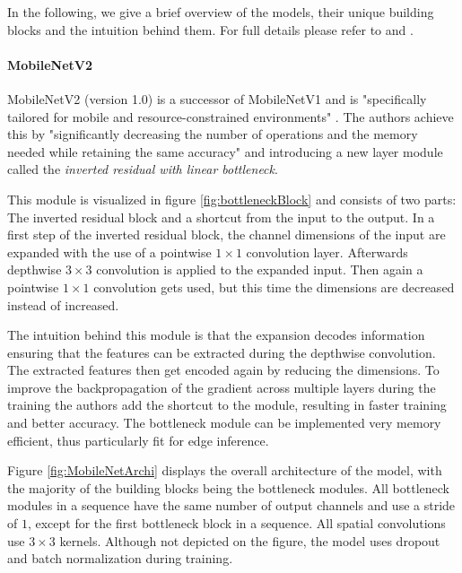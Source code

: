 In the following, we give a brief overview of the models, their unique building blocks and the intuition behind them.
For full details please refer to \cite{DBLP:journals/corr/abs-1801-04381} and \cite{InceptionV4}.

\paragraph{MobileNetV2}
MobileNetV2 (version 1.0) is a successor of MobileNetV1 and is "specifically tailored for mobile and resource-constrained environments" \cite{DBLP:journals/corr/abs-1801-04381}. The authors achieve this by "significantly decreasing the number of operations and the memory needed while retaining the same accuracy"  \cite{DBLP:journals/corr/abs-1801-04381} and introducing a new layer module called the
\emph{inverted residual with linear bottleneck}.

This module is visualized in figure \ref{fig:bottleneckBlock} and consists of two parts: The inverted residual block and a shortcut from the input to the output.
In a first step of the inverted residual block, the channel dimensions of the input are expanded with the use of a pointwise $1\times1$ convolution layer. 
Afterwards depthwise $3\times3$ convolution is applied to the expanded input. Then again a pointwise $1\times1$ convolution gets used, but this time the dimensions are decreased instead of increased.

The intuition behind this module is that the expansion decodes information ensuring that the features can be extracted during the depthwise convolution. The extracted features then get encoded again by reducing the dimensions.
To improve the backpropagation of the gradient across multiple layers during the training the authors add the shortcut to the module, resulting in faster training and better accuracy.
The bottleneck module can be implemented very memory efficient, thus particularly fit for edge inference.

Figure \ref{fig:MobileNetArchi} displays the overall architecture of the model, with the majority of the building blocks being the bottleneck modules.
All bottleneck modules in a sequence have the same number of output channels and use a stride of $1$, except for the first bottleneck block in a sequence. All spatial convolutions use $3\times3$ kernels. 
Although not depicted on the figure, the model uses dropout and batch normalization during training.

